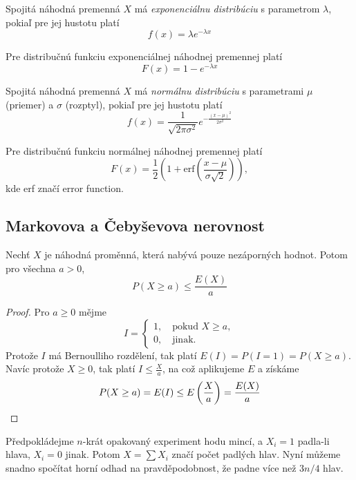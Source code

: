 {\begin{definition}
    Spojitá náhodná premenná $X$ má {\em exponenciálnu distribúciu}
    s parametrom $\lambda$, pokiaľ pre jej hustotu platí
    \[
        f(x) = \lambda e^{-\lambda x}
    \]
\end{definition}

Pre distribučnú funkciu exponenciálnej náhodnej premennej platí
	\[
        F(x) = 1-e^{-\lambda x}
    \]

\begin{definition}
    Spojitá náhodná premenná $X$ má {\em normálnu distribúciu}
    s parametrami $\mu$ (priemer) a $\sigma$ (rozptyl), pokiaľ pre jej hustotu platí
    \[
        f(x) = \frac{1}{\sqrt{2 \pi \sigma^2}}e^{-\frac{(x-\mu)^2}{2\sigma^2}}
    \]
\end{definition}

Pre distribučnú funkciu normálnej náhodnej premennej platí
	\[
        F(x) = \frac{1}{2} \left( 1+ \text{erf}\left(\frac{x-\mu}{\sigma \sqrt{2}}\right) \right),
    \]
kde erf značí error function.

\subsection{Markovova a Čebyševova nerovnost}

\begin{theorem}
    Nechť $X$ je náhodná proměnná, která nabývá pouze nezáporných
    hodnot. Potom pro všechna $a > 0$,
    \[
       P(X \geq a) \leq \frac{E(X)}{a}
\]
\end{theorem}

\begin{proof}
    Pro $a \geq 0$ mějme
    \[
        I =
        \begin{cases}
            1, \quad \text{pokud } X \geq a, \\
            0, \quad \text{jinak.}
        \end{cases}
    \]
    Protože $I$ má Bernoulliho rozdělení, tak platí $E(I) = P(I = 1) = P(X \geq a)$.
    Navíc protože $X \geq 0$, tak platí $I \leq \frac{X}{a}$, na což
    aplikujeme $E$ a získáme
    \[
        P(X \geq a) = E(I) \leq E \left(\frac{X}{a} \right) = \frac{E(X)}{a}
        \qedhere
    \]
\end{proof}

\begin{example}
    Předpokládejme $n$-krát opakovaný experiment hodu mincí,
    a $X_i = 1$ padla-li hlava, $X_i = 0$ jinak.
    Potom $X = \sum X_i$ značí počet padlých hlav. Nyní můžeme snadno
    spočítat horní odhad na pravděpodobnost, že padne více než $3n/4$
    hlav.


\end{example}}
